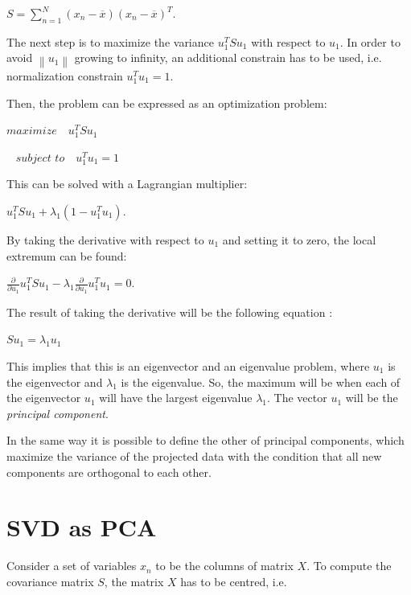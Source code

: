 {\centering$S=\sum_{n=1}^{N}(x_{n}-\overline{x})(x_{n}-\overline{x})^T.$\\}

The next step is to maximize the variance $u_{1}^TSu_{1}$ with respect to $u_{1}$. In order to avoid $\left \| u_{1} \right \|$ growing to infinity, an additional constrain has to be used,
i.e.  normalization constrain $u_{1}^Tu_{1}=1$.

Then, the problem can be expressed as an optimization problem:

{\centering$maximize\,\,\,\,\,\,u_{1}^TSu_{1}$\\}

{\centering$\,\,\,\,\,subject \,\,to \,\,\,\,\,\,u_{1}^Tu_{1}=1$\\}

This can be solved with a Lagrangian multiplier:

{\centering$u_{1}^TSu_{1}+\lambda_{1}(1-u_{1}^Tu_{1}).$\\}

By taking the derivative with respect to $u_{1}$ and setting it to zero, the local extremum can be found:

{\centering$\frac{\partial }{\partial u_{1}}u_{1}^TSu_{1}-\lambda_{1}\frac{\partial }{\partial u_{1}}u_{1}^Tu_{1}=0.$\\}

The result of taking the derivative will be the following equation \cite{Bishop}:

{\centering$Su_{1}=\lambda_{1}u_{1}$\\}

This implies that this is an eigenvector and an eigenvalue problem, where $u_{1}$ is the eigenvector and $\lambda_{1}$ is the eigenvalue.
So, the maximum will be when each of the eigenvector $u_{1}$ will have the largest eigenvalue $\lambda_{1}$. 
The vector $u_{1}$ will be the \emph{principal component}.

In the same way it is possible to define the other of principal components, 
which maximize the variance of the projected data with the condition that all new components are orthogonal to each other.


 \section{SVD as PCA}
\label{section:svd}
Consider a set of variables $x_{n}$ to be the columns of matrix $X$. To compute the covariance matrix $S$, the matrix $X$ has to be centred, i.e. 

